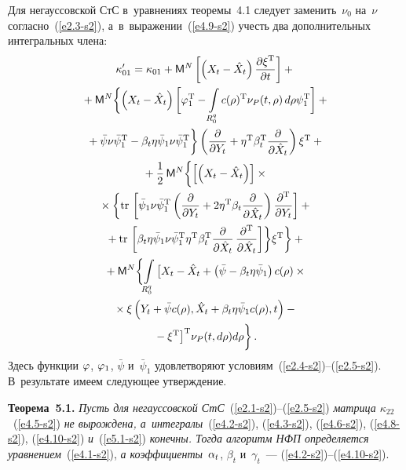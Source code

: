 \begin{multicols}{2}
Для негауссовской СтС в~уравнениях теоремы~4.1 следует заменить~$\nu_0$ 
на~$\nu$ согласно~(\ref{e2.3-s2}), а~в~выражении~(\ref{e4.9-s2}) 
учесть два дополнительных интегральных члена:
\begin{multline}
\kappa_{01}'  =\kappa_{01} + {\sf M}^N  \left[ \left(X_t - \hat X_t\right) 
\displaystyle\frac{\displaystyle \partial\xi^{\mathrm{T}}\mathstrut}{\displaystyle \partial t\mathstrut} \right] +{}\\
{}+
{\sf M}^N  \biggl\{ 
\left(X_t -\hat X_t\right) 
\bigg[ \varphi_1^{\mathrm{T}} -\int\limits_{R_0^q} c(\rho)^{\mathrm{T}} \nu_P (t,\rho)\, d\rho 
\psi_1^{\mathrm{T}} \bigg] +{}\\
{}+ \bar\psi \nu \bar\psi_1^{\mathrm{T}} - \beta_t \eta \bar \psi_1 
\nu\bar\psi_1^{\mathrm{T}} \biggr\} \left( 
\displaystyle\frac{\displaystyle \partial\mathstrut}{\displaystyle \partial Y_t\mathstrut} + \eta^{\mathrm{T}} \beta_t^{\mathrm{T}} 
\displaystyle\frac{\displaystyle \partial\mathstrut}{\displaystyle \partial \hat X_t\mathstrut}\right) \xi^{\mathrm{T}}+ {}\\
{}+
\displaystyle\frac{\displaystyle 1\mathstrut}{\displaystyle 2\mathstrut}\, {\sf M}^N \biggl\{ \left[ \left(X_t -\hat X_t\right)\right] \times{}\\
{}\times\biggl\{ 
\mathrm{tr}\, \left[ \bar\psi_1 \nu \bar\psi_1^{\mathrm{T}} \left( 
\displaystyle\frac{\displaystyle \partial\mathstrut}{\displaystyle \partial Y_t\mathstrut} + 2 \eta^{\mathrm{T}} \beta_t 
\displaystyle\frac{\displaystyle \partial\mathstrut}{\displaystyle \partial \hat X_t\mathstrut} \right) 
\displaystyle\frac{\displaystyle \partial^{\mathrm{T}}\mathstrut}{\displaystyle \partial Y_t\mathstrut} \right]+{}\\
{}+
   \mathrm{tr}\, \left[ 
   \beta_t \eta \bar\psi_1 \nu\bar\psi_1^{\mathrm{T}} \eta^{\mathrm{T}} 
   \beta_t^{\mathrm{T}} \displaystyle\frac{\displaystyle \partial\mathstrut}{\displaystyle \partial \hat X_t\mathstrut}\,
   \displaystyle\frac{\displaystyle \partial^{\mathrm{T}}\mathstrut}{\displaystyle \partial \hat X_t\mathstrut} \right] 
   \biggr\} \xi^{\mathrm{T}} \biggr\}+{}\\
{}+ {\sf M}^N \biggl\{ \int\limits_{R_0^q}  \big[ 
X_t -\hat X_t + 
\left(\bar\psi -\beta_t \eta \bar\psi_1\right) c (\rho)\times{}\\
{}\times \xi 
\left(Y_t +\bar\psi c(\rho), \hat X_t + \beta_t \eta \bar\psi_1 c(\rho), t\right) -{}\\
{}-
\xi^{\mathrm{T}}
\big]^{\mathrm{T}} \nu_P (t, d\rho) d\rho\biggr\}\,.
\label{e5.1-s2}
\end{multline}
Здесь функции $\varphi$, $\varphi_1$, $\bar\psi$ и~$\bar\psi_1$ удовлетворяют 
условиям~(\ref{e2.4-s2})--(\ref{e2.5-s2}). В~результате имеем следующее утверждение.

\smallskip

\noindent
\textbf{Теорема~5.1.} 
\textit{Пусть для негауссовской СтС}~(\ref{e2.1-s2})--(\ref{e2.5-s2}) 
\textit{матрица  $\kappa_{22}$}~(\ref{e4.5-s2}) \textit{не вырождена, 
а~интегралы}~(\ref{e4.2-s2}), (\ref{e4.3-s2}), (\ref{e4.6-s2}), (\ref{e4.8-s2}), 
(\ref{e4.10-s2}) \textit{и}~(\ref{e5.1-s2}) \textit{конечны.
Тогда алгоритм НФП определяется уравнением}~(\ref{e4.1-s2}), 
\textit{а коэффициенты}~$\alpha_t$, $\beta_t$ и~$\gamma_t$~--- 
(\ref{e4.2-s2})--(\ref{e4.10-s2}).


\end{multicols}
